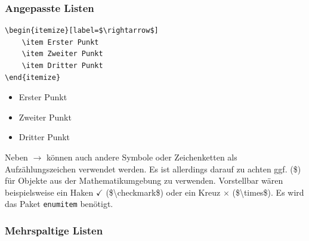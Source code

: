 \subsubsection{Angepasste Listen}

\begin{minipage}{0.58\textwidth}
    \begin{lstlisting}[language={[LaTeX]TeX}]
\begin{itemize}[label=$\rightarrow$]
    \item Erster Punkt
    \item Zweiter Punkt
    \item Dritter Punkt
\end{itemize}
\end{lstlisting}
\end{minipage}
\hfill
\begin{minipage}{0.35\textwidth}
    \begin{itemize}[label=$\rightarrow$]
        \item Erster Punkt
        \item Zweiter Punkt
        \item Dritter Punkt
    \end{itemize}
\end{minipage}

Neben $\rightarrow$ können auch andere Symbole oder Zeichenketten als Aufzählungszeichen verwendet werden. Es ist allerdings darauf zu achten ggf. (\$) für Objekte aus der Mathematikumgebung zu verwenden. Vorstellbar wären beispielsweise ein Haken $\checkmark$ (\$\textbackslash checkmark\$) oder ein Kreuz $\times$ (\$\textbackslash times\$). Es wird das Paket \texttt{enumitem} benötigt.

\subsubsection{Mehrspaltige Listen}

